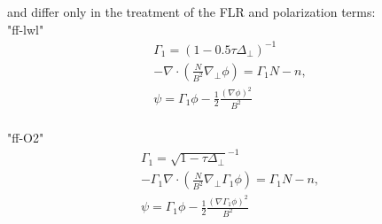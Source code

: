 and differ only in the treatment of the FLR and polarization terms:\\
"ff-lwl" 
\begin{subequations}
\begin{align}
\Gamma_1 = ( 1- 0.5\tau\Delta_{\perp})^{-1}\\
 -\nabla\cdot \left(\frac{N}{B^2} \nabla_\perp \phi\right) = \Gamma_1 N-n, \\
\psi = \Gamma_1 \phi - \frac{1}{2} \frac{(\nabla\phi)^2}{B^2}\\
\end{align}
\end{subequations}


"ff-O2"
\begin{subequations}
\begin{align}
\Gamma_1 = \sqrt{1- \tau\Delta_{\perp}}^{-1}\\
 -\Gamma_1\nabla\cdot \left(\frac{N}{B^2} \nabla_\perp\Gamma_1 \phi\right) = \Gamma_1 N-n,  \\
\psi = \Gamma_1 \phi - \frac{1}{2} \frac{(\nabla \Gamma_1\phi)^2}{B^2}
\end{align}
\end{subequations}

